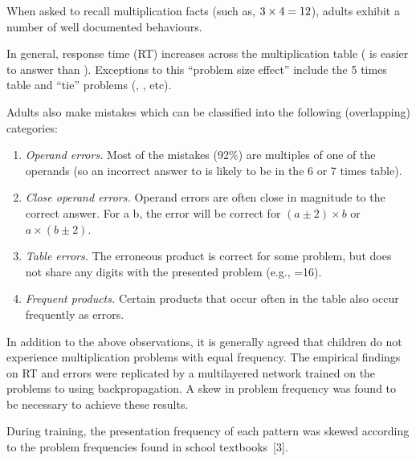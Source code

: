 \begin{multicols}{3}[\showtitle]




When asked to recall multiplication facts (such as, $\mbox{$3\times4$}=12$), adults
exhibit a number of well documented behaviours.

In general, response time (RT) increases across the
multiplication table ( is easier to answer than ).  Exceptions to
this ``problem size effect'' include the 5 times table
and ``tie'' problems (, , etc).\bigskip


Adults also make mistakes which can be classified into the following
(overlapping) categories:
\begin{enumerate}
\item {\em Operand errors.}  Most of the mistakes (92\%)
are multiples of one of the operands (so an incorrect answer to  is
likely to be in the 6 or 7 times table).
\item {\em Close operand errors.} Operand errors are often close
in magnitude to the correct
answer.  For \x a b, the error will be correct
for $(a\pm2)\times b$ or $a\times (b\pm2)$.
\item {\em Table errors.} The erroneous product is correct for some
problem, but does not share any digits with the presented problem (e.g.,
=16).
\item {\em Frequent products.}  Certain products that occur often in
the table also occur frequently as errors.
\end{enumerate}


In addition to the above observations, it is generally agreed that children
do not experience multiplication problems with equal frequency.  The
empirical findings on RT and errors were replicated by a
multilayered network trained on the problems  to  using
backpropagation.  A skew in problem frequency was found to be necessary to
achieve these results.



\vspace*{3mm}


During training, the presentation frequency of each pattern was skewed
according to the problem frequencies found in
school textbooks~[3].%



\end{multicols}

